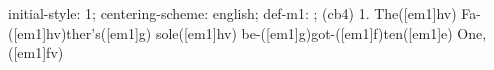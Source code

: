 initial-style: 1;
centering-scheme: english;
def-m1: \grealign;
(cb4) 1. The([em1]hv) Fa-([em1]hv)ther's([em1]g) sole([em1]hv) be-([em1]g)got-([em1]f)ten([em1]e) One,([em1]fv)